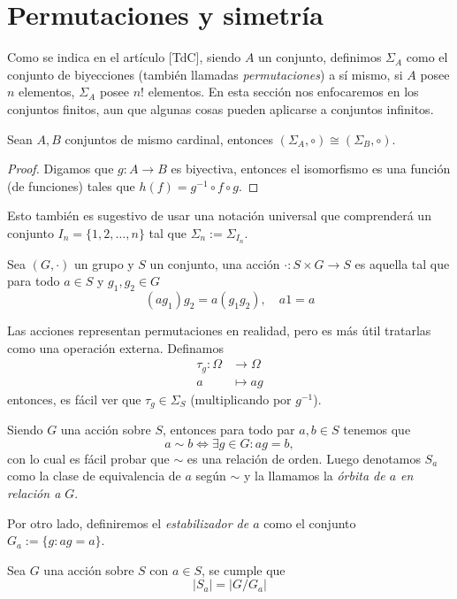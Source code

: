 \documentclass[11pt,oneside]{book}
\begin{document}
\section{Permutaciones y simetría}
Como se indica en el artículo [TdC], siendo $A$ un conjunto, definimos $\Sigma_A$  como el conjunto de biyecciones (también llamadas \textit{permutaciones}) a sí mismo, si $A$ posee $n$ elementos, $\Sigma_A$ posee $n!$ elementos. En esta sección nos enfocaremos en los conjuntos finitos, aun que algunas cosas pueden aplicarse a conjuntos infinitos.
\begin{thm}
Sean $A,B$ conjuntos de mismo cardinal, entonces $(\Sigma_A,\circ)\cong(\Sigma_B,\circ)$.
\end{thm}
\begin{proof}
Digamos que $g:A\rightarrow B$ es biyectiva, entonces el isomorfismo es una función (de funciones) tales que $h(f)=g^{-1}\circ f\circ g$.
\end{proof}
Esto también es sugestivo de usar una notación universal que comprenderá un conjunto $I_n=\{1,2,\dots,n\}$ tal que $\Sigma_n:=\Sigma_{I_n}$.
\begin{mydef}[Acción]
Sea $(G,\cdot)$ un grupo y $S$ un conjunto, una acción $\cdot:S\times G\rightarrow S$ es aquella tal que para todo $a\in S$ y $g_1,g_2\in G$
$$(ag_1)g_2=a(g_1g_2),\quad a1=a$$
\end{mydef}
Las acciones representan permutaciones en realidad, pero es más útil tratarlas como una operación externa. Definamos
\begin{align*}
\tau_g:\Omega&\longrightarrow\Omega\\
a&\longmapsto ag
\end{align*}
entonces, es fácil ver que $\tau_g\in\Sigma_S$ (multiplicando por $g^{-1}$).
\begin{mydef}
Siendo $G$ una acción sobre $S$, entonces para todo par $a,b\in S$ tenemos que
$$a\sim b\iff\exists g\in G: ag=b,$$
con lo cual es fácil probar que $\sim$ es una relación de orden. Luego denotamos $S_a$ como la clase de equivalencia de $a$ según $\sim$ y la llamamos la \textit{órbita de $a$ en relación a $G$}.

Por otro lado, definiremos el \textit{estabilizador de $a$} como el conjunto $G_a:=\{g:ag=a\}$.
\end{mydef}
\begin{thm}
Sea $G$ una acción sobre $S$ con $a\in S$, se cumple que
$$|S_a|=|G/G_a|$$
\end{thm}
\end{document}
